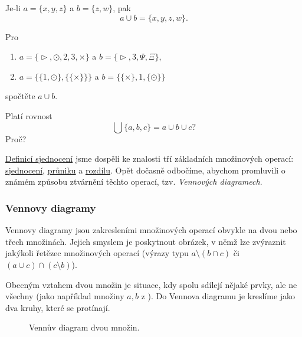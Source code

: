 \begin{example}
  \label{exam:sjednoceni-mnozin}
  Je-li $a = \{x, y, z\}$ a $b = \{z, w\}$, pak
  \[
    a \cup b = \{x, y, z, w\}.
  \]
\end{example}
\begin{exercise}
  Pro
  \begin{enumerate}
    \item $a = \{\vartriangleright, \odot, 2, 3, \times\}$ a $b =
      \{\vartriangleright, 3, \Psi, \Xi\}$,
    \item $a = \{\{1, \odot\}, \{\{\times\}\}\}$ a $b = \{\{\times\},
      1, \{\odot\}\}$
  \end{enumerate}
  spočtěte $a \cup b$.
\end{exercise}
\lessboxspace
\begin{exercise}
  Platí rovnost
  \[
    \bigcup \{a, b, c\} = a \cup b \cup c?
  \]
  Proč?
\end{exercise}

\hyperref[def:sjednoceni-mnozin]{Definicí sjednocení} jsme dospěli ke znalosti
tří základních množinových operací:
\hyperref[def:sjednoceni-mnozin]{sjednocení},
\hyperref[def:prunik-mnozin]{průniku} a \hyperref[def:rozdil-mnozin]{rozdílu}.
Opět dočasně odbočíme, abychom promluvili o známém způsobu ztvárnění těchto
operací, tzv. \emph{Vennových diagramech}.

\subsubsection{Vennovy diagramy}
\label{sssec:vennovy-diagramy}

Vennovy diagramy jsou zakresleními množinových operací obvykle na dvou nebo
třech množinách. Jejich smyslem je poskytnout obrázek, v němž lze zvýraznit
jakýkoli řetězec množinových operací (výrazy typu $a \setminus (b \cap c)$ či
$(a \cup c) \cap (c \setminus b)$).

Obecným vztahem dvou množin je situace, kdy spolu sdílejí nějaké prvky, ale ne
všechny (jako například množiny $a, b$ z
). Do Vennova diagramu je kreslíme jako
dva kruhy, které se protínají.
\begin{figure}[ht]
  \centering

  \caption{Vennův diagram dvou množin.}
  \label{fig:vennuv-diagram-1}
\end{figure}

